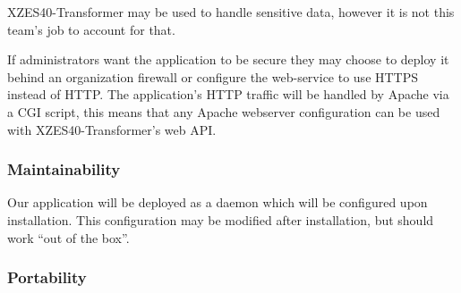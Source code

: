 XZES40-Transformer may be used to handle sensitive data, however it is not this team's job to account for that.

If administrators want the application to be secure they may choose to deploy it behind an organization firewall or configure the web-service to use HTTPS instead of HTTP.
The application's HTTP traffic will be handled by Apache via a CGI script, this means that any Apache webserver configuration can be used with XZES40-Transformer's web API.


\subsubsection{Maintainability}

Our application will be deployed as a daemon which will be configured upon installation.
This configuration may be modified after installation, but should work ``out of the box''.


\subsubsection{Portability}

